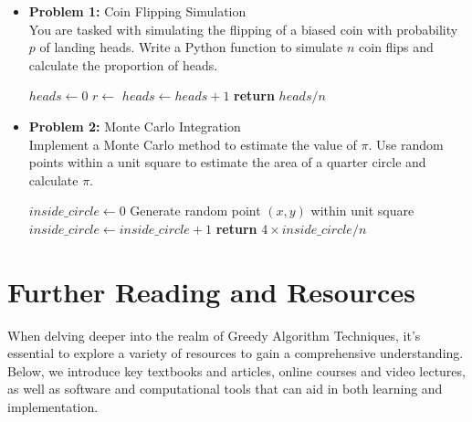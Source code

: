\documentclass[12pt]{book} %
\begin{document}
\begin{itemize}
    \item \textbf{Problem 1:} Coin Flipping Simulation \\
    You are tasked with simulating the flipping of a biased coin with probability $p$ of landing heads. Write a Python function to simulate $n$ coin flips and calculate the proportion of heads.
    
    \FloatBarrier
    \begin{algorithm}[H]
    \caption{Coin Flipping Simulation}
    \begin{algorithmic}[1]
        \State $heads \gets 0$
            \State $r \gets$  
                \State $heads \gets heads + 1$
            \EndIf
        \EndFor
        \State \textbf{return} $heads / n$ 
    \EndFunction
    \end{algorithmic}
    \end{algorithm}
    \FloatBarrier
    
    \item \textbf{Problem 2:} Monte Carlo Integration \\
    Implement a Monte Carlo method to estimate the value of $\pi$. Use random points within a unit square to estimate the area of a quarter circle and calculate $\pi$.
    
    \FloatBarrier
    \begin{algorithm}[H]
    \caption{Monte Carlo Integration for $\pi$}
    \begin{algorithmic}[1]
        \State $inside\_circle \gets 0$
            \State Generate random point $(x, y)$ within unit square
                \State $inside\_circle \gets inside\_circle + 1$
            \EndIf
        \EndFor
        \State \textbf{return} $4 \times inside\_circle / n$ 
    \EndFunction
    \end{algorithmic}
    \end{algorithm}
    \FloatBarrier
\end{itemize}

\section{Further Reading and Resources}
When delving deeper into the realm of Greedy Algorithm Techniques, it's essential to explore a variety of resources to gain a comprehensive understanding. Below, we introduce key textbooks and articles, online courses and video lectures, as well as software and computational tools that can aid in both learning and implementation.
\end{document}
